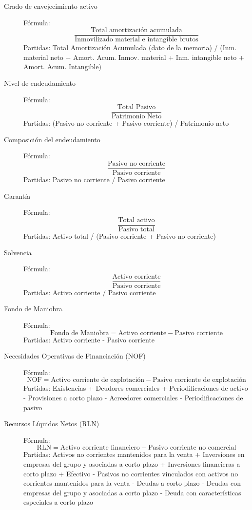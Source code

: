 \documentclass[12pt]{book} %
\begin{document}
\begin{description}
\item[Grado de envejecimiento activo]
Fórmula: $$\displaystyle \frac{\text{Total amortización acumulada}}{\text{Inmovilizado material e intangible brutos}}$$
Partidas: Total Amortización Acumulada (dato de la memoria) / (Inm. material neto + Amort. Acum. Inmov. material + Inm. intangible neto + Amort. Acum. Intangible)

\item[Nivel de endeudamiento]
Fórmula: $$\displaystyle \frac{\text{Total Pasivo}}{\text{Patrimonio Neto}}$$
Partidas: (Pasivo no corriente + Pasivo corriente) / Patrimonio neto

\item[Composición del endeudamiento]
Fórmula: $$\displaystyle \frac{\text{Pasivo no corriente}}{\text{Pasivo corriente}}$$
Partidas: Pasivo no corriente / Pasivo corriente

\item[Garantía]
Fórmula: $$\displaystyle \frac{\text{Total activo}}{\text{Pasivo total}}$$
Partidas: Activo total / (Pasivo corriente + Pasivo no corriente)

\item[Solvencia]
Fórmula: $$\displaystyle \frac{\text{Activo corriente}}{\text{Pasivo corriente}}$$
Partidas: Activo corriente / Pasivo corriente

\item[Fondo de Maniobra]
Fórmula: $$\text{Fondo de Maniobra} = \text{Activo corriente} - \text{Pasivo corriente}$$
Partidas: Activo corriente - Pasivo corriente

\item[Necesidades Operativas de Financiación (NOF)]
Fórmula: $$\text{NOF} = \text{Activo corriente de explotación} - \text{Pasivo corriente de explotación}$$
Partidas: Existencias + Deudores comerciales + Periodificaciones de activo - Provisiones a corto plazo - Acreedores comerciales - Periodificaciones de pasivo

\item[Recursos Líquidos Netos (RLN)]
Fórmula: $$\text{RLN} = \text{Activo corriente financiero} - \text{Pasivo corriente no comercial}$$
Partidas: Activos no corrientes mantenidos para la venta + Inversiones en empresas del grupo y asociadas a corto plazo + Inversiones financieras a corto plazo + Efectivo - Pasivos no corrientes vinculados con activos no corrientes mantenidos para la venta - Deudas a corto plazo - Deudas con empresas del grupo y asociadas a corto plazo - Deuda con características especiales a corto plazo


\end{description}
\end{document}
